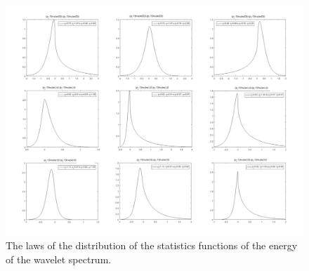 \begin{figure}[h]
\setcaptionmargin{5mm}
\onelinecaptionstrue
\includegraphics[width=1.0\textwidth]{pics/fig_4.pdf}
\caption{The laws of the distribution of the statistics functions of the energy of the wavelet spectrum.}\label{fig:fig_4}
\end{figure}
